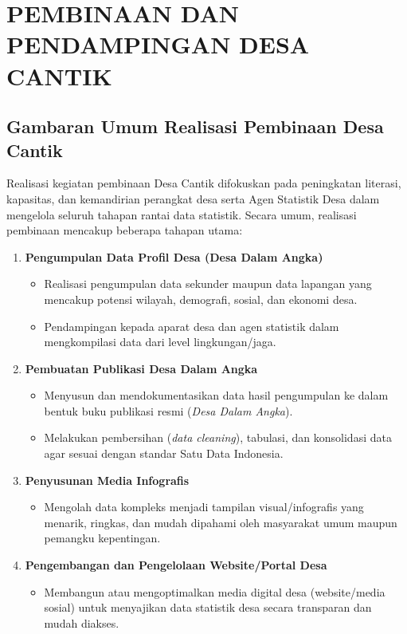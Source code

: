
\chapter{PEMBINAAN DAN PENDAMPINGAN DESA CANTIK}

\section{Gambaran Umum Realisasi Pembinaan Desa Cantik}

Realisasi kegiatan pembinaan Desa Cantik difokuskan pada peningkatan literasi, kapasitas, dan kemandirian perangkat desa serta Agen Statistik Desa dalam mengelola seluruh tahapan rantai data statistik. Secara umum, realisasi pembinaan mencakup beberapa tahapan utama:

\begin{enumerate}[label=\textbf{\textcolor{bpsnavy}{\arabic*.}}]
  \item \textbf{Pengumpulan Data Profil Desa (Desa Dalam Angka)}
  \begin{itemize}
    \item Realisasi pengumpulan data sekunder maupun data lapangan yang mencakup potensi wilayah, demografi, sosial, dan ekonomi desa.
    \item Pendampingan kepada aparat desa dan agen statistik dalam mengkompilasi data dari level lingkungan/jaga.
  \end{itemize}

  \item \textbf{Pembuatan Publikasi Desa Dalam Angka}
  \begin{itemize}
    \item Menyusun dan mendokumentasikan data hasil pengumpulan ke dalam bentuk buku publikasi resmi (\textit{Desa Dalam Angka}).
    \item Melakukan pembersihan (\textit{data cleaning}), tabulasi, dan konsolidasi data agar sesuai dengan standar Satu Data Indonesia.
  \end{itemize}

  \item \textbf{Penyusunan Media Infografis}
  \begin{itemize}
    \item Mengolah data kompleks menjadi tampilan visual/infografis yang menarik, ringkas, dan mudah dipahami oleh masyarakat umum maupun pemangku kepentingan.
  \end{itemize}

  \item \textbf{Pengembangan dan Pengelolaan Website/Portal Desa}
  \begin{itemize}
    \item Membangun atau mengoptimalkan media digital desa (website/media sosial) untuk menyajikan data statistik desa secara transparan dan mudah diakses.
  \end{itemize}
\end{enumerate}

